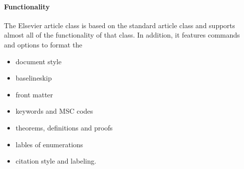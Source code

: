 \paragraph{Functionality} The Elsevier article class is based on the standard article class and supports almost all of the functionality of that class. In addition, it features commands and options to format the
\begin{itemize}
\item document style
\item baselineskip
\item front matter
\item keywords and MSC codes
\item theorems, definitions and proofs
\item lables of enumerations
\item citation style and labeling.
\end{itemize}